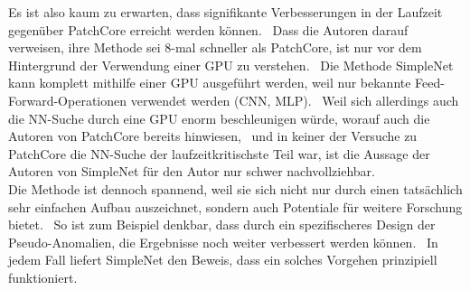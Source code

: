 Es ist also kaum zu erwarten, dass signifikante Verbesserungen in der Laufzeit gegenüber PatchCore erreicht werden können. \
Dass die Autoren darauf verweisen, ihre Methode sei 8-mal schneller als PatchCore, ist nur vor dem Hintergrund der Verwendung einer GPU zu verstehen. \
Die Methode SimpleNet kann komplett mithilfe einer GPU ausgeführt werden, weil nur bekannte Feed-Forward-Operationen verwendet werden (CNN, MLP). \
Weil sich allerdings auch die NN-Suche durch eine GPU enorm beschleunigen würde, worauf auch die Autoren von PatchCore bereits hinwiesen, \
und in keiner der Versuche zu PatchCore die NN-Suche der laufzeitkritischste Teil war, ist die Aussage der Autoren von SimpleNet für den Autor nur schwer nachvollziehbar. \\
Die Methode ist dennoch spannend, weil sie sich nicht nur durch einen tatsächlich sehr einfachen Aufbau auszeichnet, sondern auch Potentiale für weitere Forschung bietet. \
So ist zum Beispiel denkbar, dass durch ein spezifischeres Design der Pseudo-Anomalien, die Ergebnisse noch weiter verbessert werden können. \
In jedem Fall liefert SimpleNet den Beweis, dass ein solches Vorgehen prinzipiell funktioniert. \\